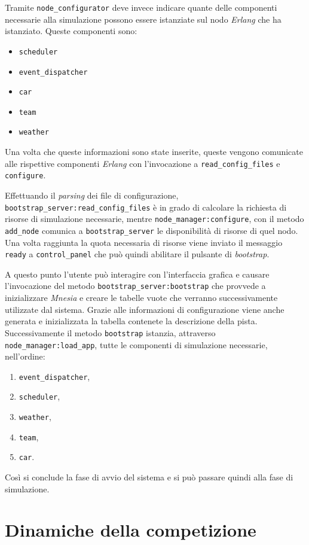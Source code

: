 \documentclass[11pt,a4paper]{report}
\newcommand{\Erlang}{\textsl{Erlang}}
\newcommand{\fun}[1]{\texttt{#1}}
\begin{document}
Tramite \texttt{node\_configurator} deve invece indicare quante delle componenti necessarie alla simulazione possono essere istanziate sul nodo \Erlang{} che ha istanziato. Queste componenti sono:
\begin{itemize}
\item \texttt{scheduler}
\item \texttt{event\_dispatcher}
\item \texttt{car}
\item \texttt{team}
\item \texttt{weather}
\end{itemize}

Una volta che queste informazioni sono state inserite, queste vengono comunicate alle rispettive componenti \Erlang{} con l'invocazione a \fun{read\_config\_files} e \fun{configure}.

Effettuando il \textit{parsing} dei file di configurazione, \fun{bootstrap\_server:read\_config\_files} è in grado di calcolare la richiesta di risorse di simulazione necessarie, mentre \fun{node\_manager:configure}, con il metodo \fun{add\_node} comunica a \texttt{bootstrap\_server} le disponibilità di risorse di quel nodo. Una volta raggiunta la quota necessaria di risorse viene inviato il messaggio \fun{ready} a \texttt{control\_panel} che può quindi abilitare il pulsante di \textit{bootstrap}.

A questo punto l'utente può interagire con l'interfaccia grafica e causare l'invocazione del metodo \fun{bootstrap\_server:bootstrap} che provvede a inizializzare \textsl{Mnesia} e creare le tabelle vuote che verranno successivamente utilizzate dal sistema. Grazie alle informazioni di configurazione viene anche generata e inizializzata la tabella contenete la descrizione della pista. Successivamente il metodo \fun{bootstrap} istanzia, attraverso \fun{node\_manager:load\_app}, tutte le componenti di simulazione necessarie, nell'ordine:
\begin{enumerate}
\item \texttt{event\_dispatcher},
\item \texttt{scheduler},
\item \texttt{weather},
\item \texttt{team},
\item \texttt{car}.
\end{enumerate}

Così si conclude la fase di avvio del sistema e si può passare quindi alla fase di simulazione.

\section{Dinamiche della competizione}
\end{document}

